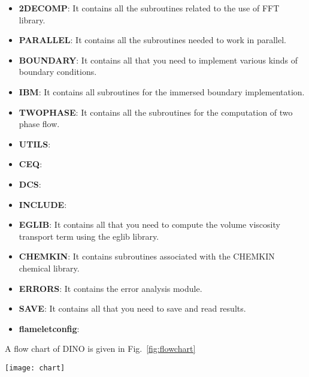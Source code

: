 \begin{itemize}
  \item \textbf{2DECOMP}: It contains all the subroutines related to the use of FFT library.
  \item \textbf{PARALLEL}: It contains all the subroutines needed to work in parallel.
  \item \textbf{BOUNDARY}: It contains all that you need to implement various kinds of boundary conditions.
  \item \textbf{IBM}: It contains all subroutines for the immersed boundary implementation.
  \item \textbf{TWOPHASE}: It contains all the subroutines for the computation of two phase flow.
  \item \textbf{UTILS}:
  \item \textbf{CEQ}:
  \item \textbf{DCS}:
  \item \textbf{INCLUDE}:
  \item \textbf{EGLIB}: It contains all that you need to compute the volume viscosity transport term using the eglib library.
  \item \textbf{CHEMKIN}: It contains subroutines associated with the CHEMKIN chemical library.
  \item \textbf{ERRORS}: It contains the error analysis module.
  \item \textbf{SAVE}: It contains all that you need to save and read results.
  \item \textbf{flameletconfig}:
\end{itemize}
A flow chart of DINO is given in Fig.~\ref{fig:flowchart}
\begin{figure*}[htbp]
\centering
\texttt{[image: chart]}
\caption{Flow chart of DINO}
 \label{fig:flowchart}
\end{figure*}

